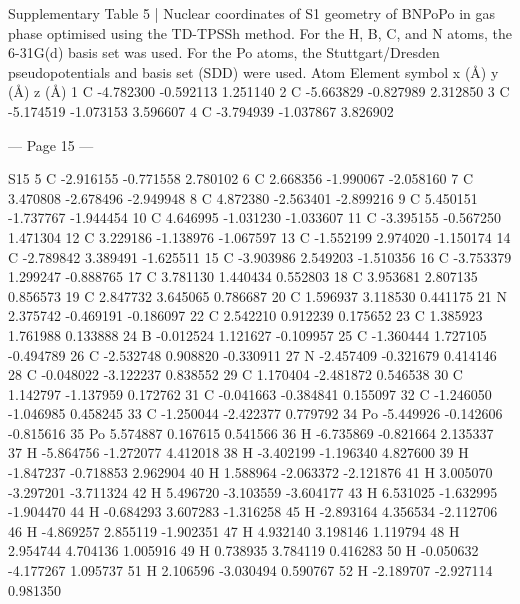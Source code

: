  
Supplementary Table 5 | Nuclear coordinates of S1 geometry of BNPoPo in gas phase 
optimised using the TD-TPSSh method. For the H, B, C, and N atoms, the 6-31G(d) basis set 
was used. For the Po atoms, the Stuttgart/Dresden pseudopotentials and basis set (SDD) were 
used. 
Atom 
Element symbol 
x (Å)        
y (Å)       
z (Å)        
1 
C 
-4.782300  
-0.592113  
1.251140  
2 
C 
-5.663829  
-0.827989  
2.312850  
3 
C 
-5.174519  
-1.073153  
3.596607  
4 
C 
-3.794939  
-1.037867  
3.826902  


--- Page 15 ---
 
S15 
5 
C 
-2.916155  
-0.771558  
2.780102  
6 
C 
2.668356  
-1.990067  
-2.058160  
7 
C 
3.470808  
-2.678496  
-2.949948  
8 
C 
4.872380  
-2.563401  
-2.899216  
9 
C 
5.450151  
-1.737767  
-1.944454  
10 
C 
4.646995  
-1.031230  
-1.033607  
11 
C 
-3.395155  
-0.567250  
1.471304  
12 
C 
3.229186  
-1.138976  
-1.067597  
13 
C 
-1.552199  
2.974020  
-1.150174  
14 
C 
-2.789842  
3.389491  
-1.625511  
15 
C 
-3.903986  
2.549203  
-1.510356  
16 
C 
-3.753379  
1.299247  
-0.888765  
17 
C 
3.781130  
1.440434  
0.552803  
18 
C 
3.953681  
2.807135  
0.856573  
19 
C 
2.847732  
3.645065  
0.786687  
20 
C 
1.596937  
3.118530  
0.441175  
21 
N 
2.375742  
-0.469191  
-0.186097  
22 
C 
2.542210  
0.912239  
0.175652  
23 
C 
1.385923  
1.761988  
0.133888  
24 
B 
-0.012524  
1.121627  
-0.109957  
25 
C 
-1.360444  
1.727105  
-0.494789  
26 
C 
-2.532748  
0.908820  
-0.330911  
27 
N 
-2.457409  
-0.321679  
0.414146  
28 
C 
-0.048022  
-3.122237  
0.838552  
29 
C 
1.170404  
-2.481872  
0.546538  
30 
C 
1.142797  
-1.137959  
0.172762  
31 
C 
-0.041663  
-0.384841  
0.155097  
32 
C 
-1.246050  
-1.046985  
0.458245  
33 
C 
-1.250044  
-2.422377  
0.779792  
34 
Po 
-5.449926  
-0.142606  
-0.815616  
35 
Po 
5.574887  
0.167615  
0.541566  
36 
H 
-6.735869  
-0.821664  
2.135337  
37 
H 
-5.864756  
-1.272077  
4.412018  
38 
H 
-3.402199  
-1.196340  
4.827600  
39 
H 
-1.847237  
-0.718853  
2.962904  
40 
H 
1.588964  
-2.063372  
-2.121876  
41 
H 
3.005070  
-3.297201  
-3.711324  
42 
H 
5.496720  
-3.103559  
-3.604177  
43 
H 
6.531025  
-1.632995  
-1.904470  
44 
H 
-0.684293  
3.607283  
-1.316258  
45 
H 
-2.893164  
4.356534  
-2.112706  
46 
H 
-4.869257  
2.855119  
-1.902351  
47 
H 
4.932140  
3.198146  
1.119794  
48 
H 
2.954744  
4.704136  
1.005916  
49 
H 
0.738935  
3.784119  
0.416283  
50 
H 
-0.050632  
-4.177267  
1.095737  
51 
H 
2.106596  
-3.030494  
0.590767  
52 
H 
-2.189707  
-2.927114  
0.981350  
 


